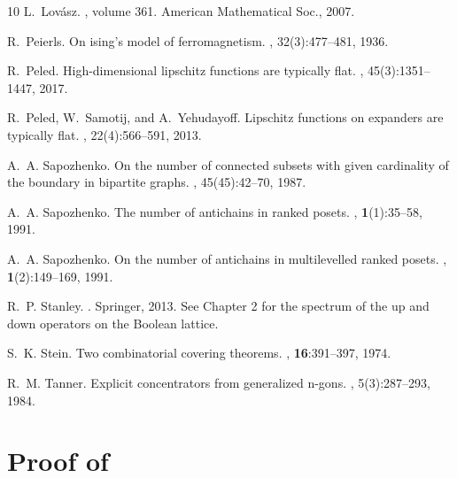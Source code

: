 \documentclass{amsart}
\theoremstyle{definition}
\newcommand{\0}[0]{\emptyset}
\begin{document}
\begin{thebibliography}{10}
L.~Lov{\'a}sz.
, volume 361.
\newblock American Mathematical Soc., 2007.

R.~Peierls.
\newblock On ising's model of ferromagnetism.
, 32(3):477--481, 1936.

R.~Peled.
\newblock High-dimensional lipschitz functions are typically flat.
, 45(3):1351--1447, 2017.

R.~Peled, W.~Samotij, and A.~Yehudayoff.
\newblock Lipschitz functions on expanders are typically flat.
, 22(4):566--591, 2013.

A.~A. Sapozhenko.
\newblock On the number of connected subsets with given cardinality of the boundary in bipartite graphs.
, 45(45):42--70, 1987.

A.~A. Sapozhenko.
\newblock The number of antichains in ranked posets.
, \textbf{1}(1):35--58, 1991.

A.~A. Sapozhenko.
\newblock On the number of antichains in multilevelled ranked posets.
, \textbf{1}(2):149--169, 1991.

R.~P. Stanley.
.
\newblock Springer, 2013.
\newblock See Chapter 2 for the spectrum of the up and down operators on the Boolean lattice.

S.~K. Stein.
\newblock Two combinatorial covering theorems.
, \textbf{16}:391--397, 1974.

R.~M. Tanner.
\newblock Explicit concentrators from generalized n-gons.
, 5(3):287--293, 1984.

\end{thebibliography}




\appendix

\section{Proof of }\label{app:1}
\end{document}
